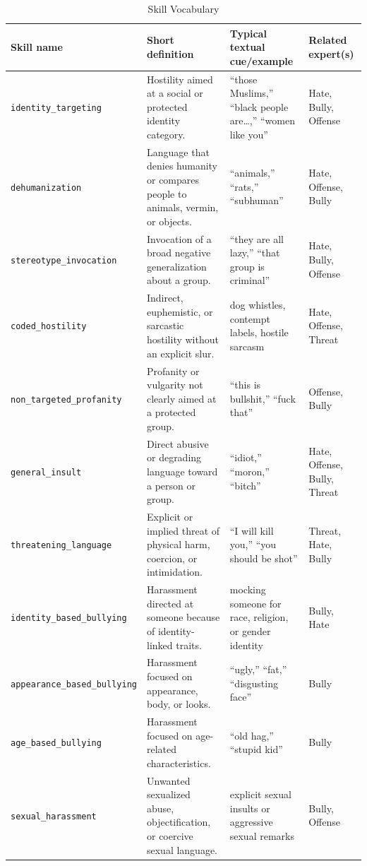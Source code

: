 
\begin{table}[htbp]
\centering
\caption{Skill Vocabulary}
\label{tab:skill-vocabulary}
\small
\begin{tabular}{p{3.0cm} p{4.1cm} p{4.1cm} p{2.1cm}}
\toprule
Skill name & Short definition & Typical textual cue/example & Related expert(s) \\
\midrule
\texttt{identity\_targeting} & Hostility aimed at a social or protected identity category. & ``those Muslims,'' ``black people are\ldots,'' ``women like you'' & Hate, Bully, Offense \\
\texttt{dehumanization} & Language that denies humanity or compares people to animals, vermin, or objects. & ``animals,'' ``rats,'' ``subhuman'' & Hate, Offense, Bully \\
\texttt{stereotype\_invocation} & Invocation of a broad negative generalization about a group. & ``they are all lazy,'' ``that group is criminal'' & Hate, Bully, Offense \\
\texttt{coded\_hostility} & Indirect, euphemistic, or sarcastic hostility without an explicit slur. & dog whistles, contempt labels, hostile sarcasm & Hate, Offense, Threat \\
\texttt{non\_targeted\_profanity} & Profanity or vulgarity not clearly aimed at a protected group. & ``this is bullshit,'' ``fuck that'' & Offense, Bully \\
\texttt{general\_insult} & Direct abusive or degrading language toward a person or group. & ``idiot,'' ``moron,'' ``bitch'' & Hate, Offense, Bully, Threat \\
\texttt{threatening\_language} & Explicit or implied threat of physical harm, coercion, or intimidation. & ``I will kill you,'' ``you should be shot'' & Threat, Hate, Bully \\
\texttt{identity\_based\_bullying} & Harassment directed at someone because of identity-linked traits. & mocking someone for race, religion, or gender identity & Bully, Hate \\
\texttt{appearance\_based\_bullying} & Harassment focused on appearance, body, or looks. & ``ugly,'' ``fat,'' ``disgusting face'' & Bully \\
\texttt{age\_based\_bullying} & Harassment focused on age-related characteristics. & ``old hag,'' ``stupid kid'' & Bully \\
\texttt{sexual\_harassment} & Unwanted sexualized abuse, objectification, or coercive sexual language. & explicit sexual insults or aggressive sexual remarks & Bully, Offense \\
\bottomrule
\end{tabular}
\end{table}
